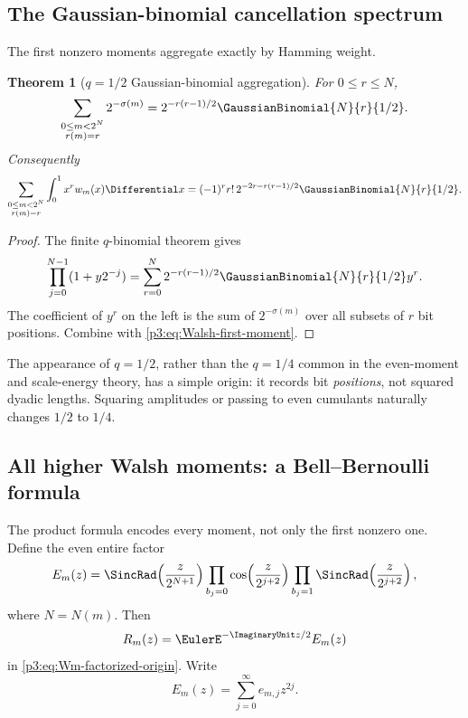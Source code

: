 \documentclass[11pt]{article}
\newtheorem{theorem}{Theorem}[section]
\theoremstyle{definition}
\theoremstyle{remark}
\begin{document}
\subsection{The Gaussian-binomial cancellation spectrum}

The first nonzero moments aggregate exactly by Hamming weight.

\begin{theorem}[$q=1/2$ Gaussian-binomial aggregation]
\label{p3:thm:qbinom-Walsh}
For $0\le r\le N$,
\begin{equation}\label{p3:eq:sigma-qbinom}
 \sum_{\substack{0\le m<2^N\\r(m)=r}}2^{-\sigma(m)}
 =2^{-r(r-1)/2}\GaussianBinomial{N}{r}{1/2}.
\end{equation}
Consequently
\begin{equation}\label{p3:eq:first-moment-qbinom}
 \sum_{\substack{0\le m<2^N\\r(m)=r}}
 \int_0^1x^rw_m(x)\Differential x
 =(-1)^rr!\,2^{-2r-r(r-1)/2}\GaussianBinomial{N}{r}{1/2}.
\end{equation}
\end{theorem}

\begin{proof}
The finite $q$-binomial theorem gives
\[
 \prod_{j=0}^{N-1}(1+y2^{-j})
 =\sum_{r=0}^N2^{-r(r-1)/2}\GaussianBinomial{N}{r}{1/2}y^r.
\]
The coefficient of $y^r$ on the left is the sum of $2^{-\sigma(m)}$ over
all subsets of $r$ bit positions.  Combine with
\eqref{p3:eq:Walsh-first-moment}.
\end{proof}

The appearance of $q=1/2$, rather than the $q=1/4$ common in the even-moment
and scale-energy theory, has a simple origin: it records bit \emph{positions},
not squared dyadic lengths.  Squaring amplitudes or passing to even cumulants
naturally changes $1/2$ to $1/4$.

\subsection{All higher Walsh moments: a Bell--Bernoulli formula}

The product formula encodes every moment, not only the first nonzero one.
Define the even entire factor
\begin{equation}\label{p3:eq:Em-def}
 E_m(z)=
 \SincRad\!\left(\frac{z}{2^{N+1}}\right)
 \prod_{b_j=0}\cos\!\left(\frac{z}{2^{j+2}}\right)
 \prod_{b_j=1}\SincRad\!\left(\frac{z}{2^{j+2}}\right),
\end{equation}
where $N=N(m)$.  Then
\begin{equation}\label{p3:eq:R-m-E}
 R_m(z)=\EulerE^{-\ImaginaryUnit z/2}E_m(z)
\end{equation}
in \eqref{p3:eq:Wm-factorized-origin}.  Write
\begin{equation}\label{p3:eq:E-coefficients}
 E_m(z)=\sum_{j=0}^\infty e_{m,j}z^{2j}.
\end{equation}
\end{document}
